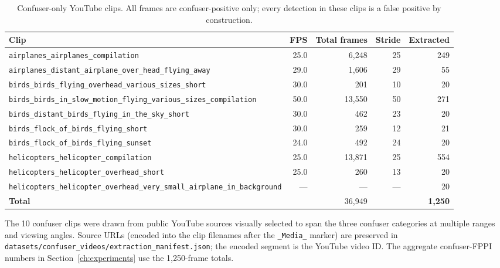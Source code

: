 \begin{table}[htbp]
    \centering
    \caption{Confuser-only YouTube clips. All frames are confuser-positive only; every detection in these clips is a false positive by construction.}
    \label{tab:youtube_confuser_clips}
    \begin{tabular}{lrrrr}
        \toprule
        Clip & FPS & Total frames & Stride & Extracted \\
        \midrule
        \texttt{airplanes\_airplanes\_compilation}             & 25.0 & 6{,}248 & 25 & 249 \\
        \texttt{airplanes\_distant\_airplane\_over\_head\_flying\_away} & 29.0 & 1{,}606 & 29 & 55 \\
        \texttt{birds\_birds\_flying\_overhead\_various\_sizes\_short} & 30.0 & 201 & 10 & 20 \\
        \texttt{birds\_birds\_in\_slow\_motion\_flying\_various\_sizes\_compilation} & 50.0 & 13{,}550 & 50 & 271 \\
        \texttt{birds\_distant\_birds\_flying\_in\_the\_sky\_short} & 30.0 & 462 & 23 & 20 \\
        \texttt{birds\_flock\_of\_birds\_flying\_short}        & 30.0 & 259 & 12 & 21 \\
        \texttt{birds\_flock\_of\_birds\_flying\_sunset}      & 24.0 & 492 & 24 & 20 \\
        \texttt{helicopters\_helicopter\_compilation}          & 25.0 & 13{,}871 & 25 & 554 \\
        \texttt{helicopters\_helicopter\_overhead\_short}      & 25.0 & 260 & 13 & 20 \\
        \texttt{helicopters\_helicopter\_overhead\_very\_small\_airplane\_in\_background} & --- & --- & --- & 20 \\
        \midrule
        \textbf{Total} & & 36{,}949 & & \textbf{1{,}250} \\
        \bottomrule
    \end{tabular}
\end{table}

\noindent The 10 confuser clips were drawn from public YouTube sources visually selected to span the three confuser categories at multiple ranges and viewing angles. Source URLs (encoded into the clip filenames after the \texttt{\_Media\_} marker) are preserved in \texttt{datasets/confuser\_videos/extraction\_manifest.json}; the encoded segment is the YouTube video ID. The aggregate confuser-FPPI numbers in Section~\ref{ch:experiments} use the 1{,}250-frame totals.

